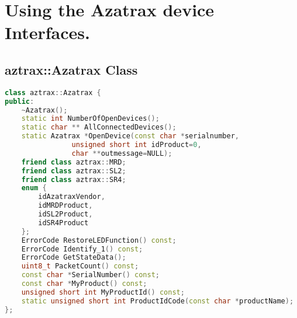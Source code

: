 

\chapter{Using the Azatrax device Interfaces.}
\label{chapt:Azatrax:AzatraxProgramming}

\section{aztrax::Azatrax Class}
\label{sect:Azatrax:AzatraxClass}

\begin{lstlisting}[caption={azatrax::Azatrax Class (simplified public interface)}, 
		  language=C++,label=lst:Azatrax:AzatraxClass]
class aztrax::Azatrax {
public:
	~Azatrax();
	static int NumberOfOpenDevices();
	static char ** AllConnectedDevices();
	static Azatrax *OpenDevice(const char *serialnumber, 
				unsigned short int idProduct=0,
				char **outmessage=NULL);
	friend class aztrax::MRD;
	friend class aztrax::SL2;
	friend class aztrax::SR4;
	enum {
		idAzatraxVendor,
		idMRDProduct,
		idSL2Product,
		idSR4Product 
	};
	ErrorCode RestoreLEDFunction() const;
	ErrorCode Identify_1() const;
	ErrorCode GetStateData();
	uint8_t PacketCount() const;
	const char *SerialNumber() const;
	const char *MyProduct() const;
	unsigned short int MyProductId() const;
	static unsigned short int ProductIdCode(const char *productName);
};
\end{lstlisting}

